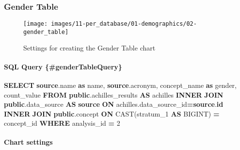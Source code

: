 \documentclass[
]{book}
\newenvironment{Shaded}{\begin{snugshade}}{\end{snugshade}}
\newcommand{\DecValTok}[1]{\textcolor[rgb]{0.00,0.00,0.81}{#1}}
\newcommand{\FunctionTok}[1]{\textcolor[rgb]{0.00,0.00,0.00}{#1}}
\newcommand{\KeywordTok}[1]{\textcolor[rgb]{0.13,0.29,0.53}{\textbf{#1}}}
\newcommand{\NormalTok}[1]{#1}
\newcommand{\OperatorTok}[1]{\textcolor[rgb]{0.81,0.36,0.00}{\textbf{#1}}}
\begin{document}
\hypertarget{gender-table}{%
\subsubsection*{Gender Table}\label{gender-table}}

\begin{figure}
\texttt{[image: images/11-per\_database/01-demographics/02-gender\_table]} \caption{Settings for creating the Gender Table chart}\label{fig:genderTable}
\end{figure}

\hypertarget{sql-query-gendertablequery}{%
\paragraph*{SQL Query \{\#genderTableQuery\}}\label{sql-query-gendertablequery}}

\begin{Shaded}
\begin{Highlighting}[]
\KeywordTok{SELECT} \KeywordTok{source}\NormalTok{.name }\KeywordTok{as}\NormalTok{ name,}
       \KeywordTok{source}\NormalTok{.acronym,}
\NormalTok{       concept\_name }\KeywordTok{as}\NormalTok{ gender,}
\NormalTok{       count\_value}
\KeywordTok{FROM} \KeywordTok{public}\NormalTok{.achilles\_results }\KeywordTok{AS}\NormalTok{ achilles}
\KeywordTok{INNER} \KeywordTok{JOIN} \KeywordTok{public}\NormalTok{.data\_source }\KeywordTok{AS} \KeywordTok{source} \KeywordTok{ON}\NormalTok{ achilles.data\_source\_id}\OperatorTok{=}\KeywordTok{source}\NormalTok{.}\KeywordTok{id}
\KeywordTok{INNER} \KeywordTok{JOIN} \KeywordTok{public}\NormalTok{.concept }\KeywordTok{ON} \FunctionTok{CAST}\NormalTok{(stratum\_1 }\KeywordTok{AS}\NormalTok{ BIGINT) }\OperatorTok{=}\NormalTok{ concept\_id}
\KeywordTok{WHERE}\NormalTok{ analysis\_id }\OperatorTok{=} \DecValTok{2}
\end{Highlighting}
\end{Shaded}

\hypertarget{chart-settings-2}{%
\paragraph*{Chart settings}\label{chart-settings-2}}
\end{document}
